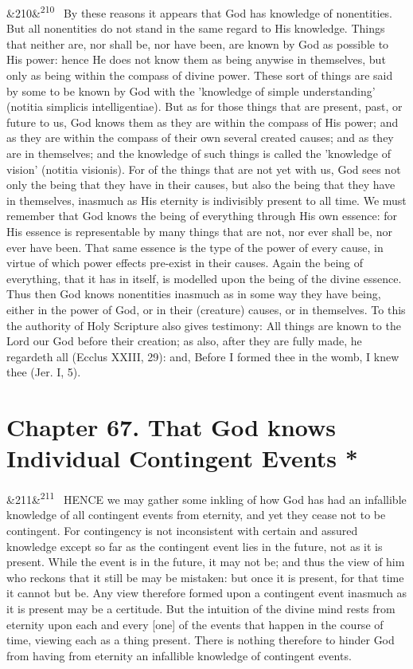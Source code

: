 \documentclass[12pt]{article}
\newcommand{\para}[1][]{\par\noindent\ifx&#1&\else\textsuperscript{\footnotesize #1}~\fi}
\begin{document}
\para[210] By these reasons it appears that God has knowledge of nonentities. But all nonentities do not stand in the same regard to His knowledge. Things that neither are, nor shall be, nor have been, are known by God as possible to His power: hence He does not know them as being anywise in themselves, but only as being within the compass of divine power. These sort of things are said by some to be known by God with the 'knowledge of simple understanding' (notitia simplicis intelligentiae). But as for those things that are present, past, or future to us, God knows them as they are within the compass of His power; and as they are within the compass of their own several created causes; and as they are in themselves; and the knowledge of such things is called the 'knowledge of vision' (notitia visionis). For of the things that are not yet with us, God sees not only the being that they have in their causes, but also the being that they have in themselves, inasmuch as His eternity is indivisibly present to all time. We must remember that God knows the being of everything through His own essence: for His essence is representable by many things that are not, nor ever shall be, nor ever have been. That same essence is the type of the power of every cause, in virtue of which power effects pre-exist in their causes. Again the being of everything, that it has in itself, is modelled upon the being of the divine essence. Thus then God knows nonentities inasmuch as in some way they have being, either in the power of God, or in their (creature) causes, or in themselves. To this the authority of Holy Scripture also gives testimony: All things are known to the Lord our God before their creation; as also, after they are fully made, he regardeth all (Ecclus XXIII, 29): and, Before I formed thee in the womb, I knew thee (Jer. I, 5).

\section*{Chapter 67. That God knows Individual Contingent Events *}

\para[211] HENCE we may gather some inkling of how God has had an infallible knowledge of all contingent events from eternity, and yet they cease not to be contingent. For contingency is not inconsistent with certain and assured knowledge except so far as the contingent event lies in the future, not as it is present. While the event is in the future, it may not be; and thus the view of him who reckons that it still be may be mistaken: but once it is present, for that time it cannot but be. Any view therefore formed upon a contingent event inasmuch as it is present may be a certitude. But the intuition of the divine mind rests from eternity upon each and every [one] of the events that happen in the course of time, viewing each as a thing present. There is nothing therefore to hinder God from having from eternity an infallible knowledge of contingent events.
\end{document}
